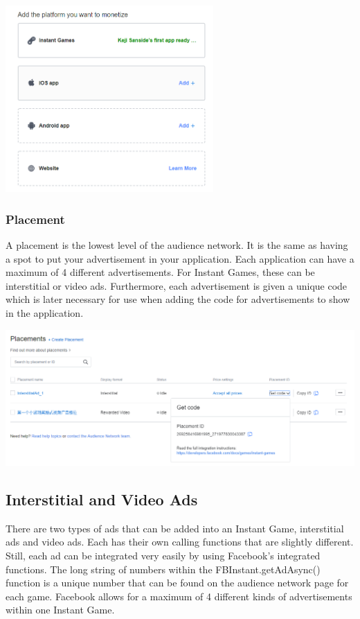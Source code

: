 \documentclass{article}
\begin{document}
\begin{center}
\includegraphics[width = 300px]{images/Platform.png}
\end{center}

\subsubsection{Placement}
A placement is the lowest level of the audience network. It is the same as having a spot to put your advertisement in your application. Each application can have a maximum of 4 different advertisements. For Instant Games, these can be interstitial or video ads. Furthermore, each advertisement is given a unique code which is later necessary for use when adding the code for advertisements to show in the application.

\begin{center}
\includegraphics[width = \textwidth]{images/Placements.png}
\end{center}

\subsection{Interstitial and Video Ads}
There are two types of ads that can be added into an Instant Game, interstitial ads and video ads. Each has their own calling functions that are slightly different. Still, each ad can be integrated very easily by using Facebook's integrated functions. The long string of numbers within the FBInstant.getAdAsync() function is a unique number that can be found on the audience network page for each game. Facebook allows for a maximum of 4 different kinds of advertisements within one Instant Game.
\end{document}
